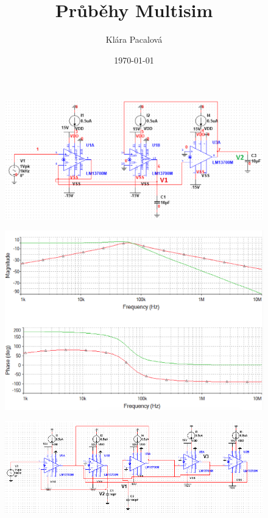 \documentclass[twoside]{article}
\title{Průběhy Multisim}
\author{Klára Pacalová}
\date{\today}
\begin{document}
\def\MapleOutput#1{{\begin{center}\begin{math}\color{MapleBlue}{#1}\end{math}\end{center}}}

\maketitle

\begin{figure}[H]
\centering
\includegraphics[scale=0.4]{bplp.png}
\end{figure}\begin{figure}[H]
\centering
\includegraphics[scale=0.5]{bplp2.png}
\end{figure}
\begin{figure}[H]
\centering
\includegraphics[scale=0.7]{bplphp.png}
\end{figure}
\end{document}
